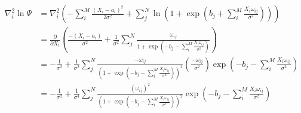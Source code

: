 \begin{align*}
\nabla_i^2 \ln \Psi &= \nabla_i^2 \left( - \sum_{i}^{M} \frac{(X_i - a_i)^2}{2 \sigma^2} +  \sum_{j}^{N} \ln \left( 1 + \exp \left( b_j + \sum_{i}^{M} \frac{X_i \omega_{ij}}{\sigma^2} \right) \right) \right) \\
&= \frac{\partial}{\partial X_i} \left( \frac{-(X_i - a_i)}{\sigma^2} + \frac{1}{\sigma^2} \sum_{j}^{N} \frac{\omega_{ij}}{1 + \exp \left( -b_j - \sum_{i}^{M} \frac{X_i \omega_{ij}}{\sigma^2} \right)} \right) \\
&= -\frac{1}{\sigma^2} + \frac{1}{\sigma^2} \sum_{j}^{N} \frac{-\omega_{ij}}{\left(1 + \exp \left( -b_j - \sum_{i}^{M} \frac{X_i \omega_{ij}}{\sigma^2} \right)\right)^2} \left( \frac{-\omega_{ij}}{\sigma^2} \right) \exp \left( -b_j - \sum_{i}^{M} \frac{X_i \omega_{ij}}{\sigma^2} \right) \\
&= -\frac{1}{\sigma^2} + \frac{1}{\sigma^4} \sum_{j}^{N} \frac{\left(\omega_{ij}\right)^2  }{\left(1 + \exp \left( -b_j - \sum_{i}^{M} \frac{X_i \omega_{ij}}{\sigma^2} \right)\right)^2}\exp \left( -b_j - \sum_{i}^{M} \frac{X_i \omega_{ij}}{\sigma^2} \right) 
\end{align*}


